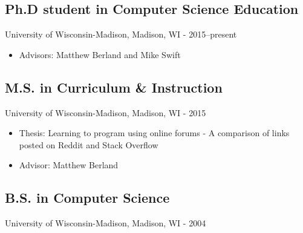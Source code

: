 \documentclass[../main.tex]{subfiles}
\begin{document}

\subsection*{Ph.D student in Computer Science Education}
	University of Wisconsin-Madison, Madison, WI - 2015--present
	\begin{itemize}
	\item{Advisors: Matthew Berland and Mike Swift}
	\end{itemize}


	\subsection*{M.S. in Curriculum \& Instruction}
	University of Wisconsin-Madison, Madison, WI - 2015
	\begin{itemize}
	\item{Thesis: Learning to program using online forums - A comparison of links posted on Reddit and Stack Overflow}
	\item{Advisor: Matthew Berland}
	\end{itemize}

	\subsection*{B.S. in Computer Science}
	University of Wisconsin-Madison, Madison, WI - 2004
\end{document}

